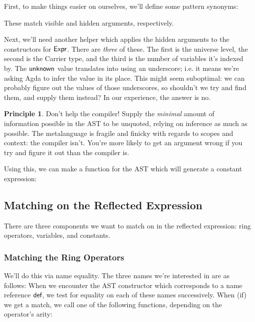 \documentclass[draft, twocolumn]{article}
\theoremstyle{definition}
\theoremstyle{definition}
\newtheorem{principle}{Principle}[section]
\begin{document}
First, to make things easier on ourselves, we'll define some pattern synonyms:

These match visible and hidden arguments, respectively.

Next, we'll need another helper which applies the hidden arguments to the
constructors for \(\AgdaDatatype{Expr}\). There are \emph{three} of these. The
first is the universe level, the second is the Carrier type, and the third is
the number of variables it's indexed by.
The \(\AgdaInductiveConstructor{unknown}\) value translates into using an
underscore; i.e. it means we're asking Agda to infer the value in its place.
This might seem suboptimal: we can probably figure out the values of those
underscores, so shouldn't we try and find them, and supply them instead? In our
experience, the answer is no.

\begin{principle}{Don't help the compiler!}
  Supply the \emph{minimal} amount of information possible in the AST to be
  unquoted, relying on inference as much as possible. The metalanguage is
  fragile and finicky with regards to scopes and context: the compiler isn't.
  You're more likely to get an argument wrong if you try and figure it out than
  the compiler is.
\end{principle}

Using this, we can make a function for the AST which will generate a constant
expression:
\subsection{Matching on the Reflected Expression}
There are three components we want to match on in the reflected expression: ring
operators, variables, and constants.
\subsubsection{Matching the Ring Operators}
We'll do this via name equality. The three names we're interested in are as
follows:
When we encounter the AST constructor which corresponds to a name reference
\(\AgdaInductiveConstructor{def}\), we test for equality on each of these names
successively. When (if) we get a match, we call one of the following functions,
depending on the operator's arity:
\end{document}
